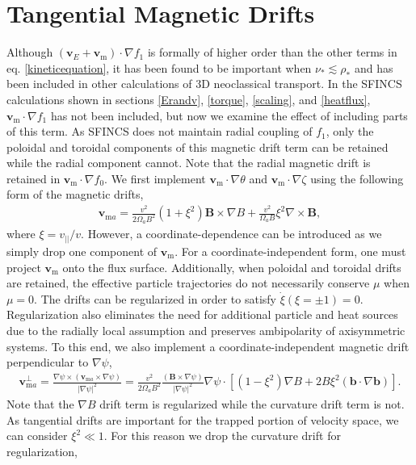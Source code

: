 \documentclass[aip, pop, preprint]{revtex4-1}
\numberwithin{figure}{section}
\numberwithin{equation}{section}
\begin{document}
\section{Tangential Magnetic Drifts}\label{mds}
Although $(\bm{v}_E + \bm{v}_{\text{m}}) \cdot \nabla f_1$ is formally of higher order than the other terms in eq. \ref{kineticequation}, it has been found to be important when $\nu_* \lesssim \rho_*$\cite{Calvo2016, Matsuoka2015} and has been included in other calculations of 3D neoclassical transport. In the SFINCS calculations shown in sections \ref{Erandv}, \ref{torque}, \ref{scaling}, and \ref{heatflux}, $\bm{v}_{\text{m}} \cdot \nabla f_1$ has not been included, but now we examine the effect of including parts of this term. As SFINCS does not maintain radial coupling of $f_1$, only the poloidal and toroidal components of this magnetic drift term can be retained while the radial component cannot. Note that the radial magnetic drift is retained in $\bm{v}_{\text{m}} \cdot \nabla f_0$. We first implement $\bm{v}_{\text{m}} \cdot \nabla \theta$ and $\bm{v}_{\text{m}}  \cdot \nabla \zeta$ using the following form of the magnetic drifts,
\begin{gather}
\bm{v}_{\text{m} a} = \frac{v^2}{2 \Omega_a B^2} (1 + \xi^2) \bm{B} \times \nabla B + \frac{v^2}{\Omega_a B} \xi^2 \nabla \times \bm{B},
\label{eq:mds1}
\end{gather}
where $\xi = v_{||}/v$. However, a coordinate-dependence can be introduced as we simply drop one component of $\bm{v}_{\text{m}}$. For a coordinate-independent form, one must project $\bm{v}_{\text{m}}$ onto the flux surface. Additionally, when poloidal and toroidal drifts are retained, the effective particle trajectories do not necessarily conserve $\mu$ when $\mu = 0$. The drifts can be regularized in order to satisfy $\dot{\xi} (\xi = \pm 1) = 0$. Regularization also eliminates the need for additional particle and heat sources due to the radially local assumption and preserves ambipolarity of axisymmetric systems.\cite{Sugama2016} To this end, we also implement a coordinate-independent magnetic drift perpendicular to $\nabla \psi$,
\begin{gather}
\bm{v}_{\text{m}a}^{\perp} = \frac{\nabla \psi \times (\bm{v}_{\text{m}a} \times \nabla \psi)}{\rvert \nabla \psi \rvert^2}= \frac{v^2}{2\Omega_a B^2 } \frac{(\bm{B} \times \nabla \psi)}{\rvert \nabla \psi \rvert^2} \nabla \psi \cdot\left[(1-\xi^2)\nabla B + 2B\xi^2 (\bm{b} \cdot \nabla \bm{b}) \right].
\end{gather}
Note that the $\nabla B$ drift term is regularized while the curvature drift term is not. As tangential drifts are important for the trapped portion of velocity space, we can consider $\xi^2 \ll 1$. For this reason we drop the curvature drift for regularization,
\end{document}
